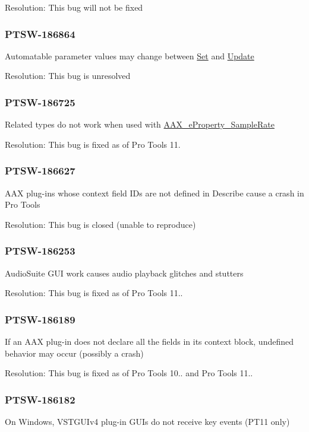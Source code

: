 Resolution\+: This bug will not be fixed\hypertarget{a00374_PTSW-186864}{}\subsubsection{P\+T\+S\+W-\/186864}\label{a00374_PTSW-186864}
Automatable parameter values may change between \hyperlink{a00033_a4dd6d99de8dc4440bac3ae4eefa19f94}{Set} and \hyperlink{a00061_a685858711efb8634ce66c327f2865c71}{Update}

Resolution\+: This bug is unresolved\hypertarget{a00374_PTSW-186725}{}\subsubsection{P\+T\+S\+W-\/186725}\label{a00374_PTSW-186725}
Related types do not work when used with \hyperlink{a00283_a6571f4e41a5dd06e4067249228e2249eac5294e2feb18587d57b6ca0216a6bb1e}{A\+A\+X\+\_\+e\+Property\+\_\+\+Sample\+Rate}

Resolution\+: This bug is fixed as of Pro Tools 11.\hypertarget{a00374_PTSW-186627}{}\subsubsection{P\+T\+S\+W-\/186627}\label{a00374_PTSW-186627}
A\+A\+X plug-\/ins whose context field I\+Ds are not defined in Describe cause a crash in Pro Tools

Resolution\+: This bug is closed (unable to reproduce)\hypertarget{a00374_PTSW-186253}{}\subsubsection{P\+T\+S\+W-\/186253}\label{a00374_PTSW-186253}
Audio\+Suite G\+U\+I work causes audio playback glitches and stutters

Resolution\+: This bug is fixed as of Pro Tools 11..\hypertarget{a00374_PTSW-186189}{}\subsubsection{P\+T\+S\+W-\/186189}\label{a00374_PTSW-186189}
If an A\+A\+X plug-\/in does not declare all the fields in its context block, undefined behavior may occur (possibly a crash)

Resolution\+: This bug is fixed as of Pro Tools 10.. and Pro Tools 11..\hypertarget{a00374_PTSW-186182}{}\subsubsection{P\+T\+S\+W-\/186182}\label{a00374_PTSW-186182}
On Windows, V\+S\+T\+G\+U\+Iv4 plug-\/in G\+U\+Is do not receive key events (P\+T11 only)

